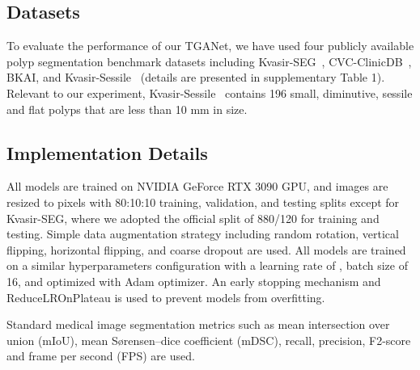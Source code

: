 \documentclass[runningheads]{llncs}
\begin{document}
\subsection{Datasets}
To evaluate the performance of our TGANet, we have used four publicly available polyp segmentation benchmark datasets including Kvasir-SEG~\cite{jha2020kvasir}, CVC-ClinicDB~\cite{bernal2015wm}, BKAI\cite{lan2021neounet}, and Kvasir-Sessile~\cite{jha2021comprehensive} (details are presented in supplementary Table 1). Relevant to our experiment, Kvasir-Sessile~\cite{jha2021comprehensive} contains 196 small, diminutive, sessile and flat polyps that are less than 10 mm in size. 

\subsection{Implementation Details}
All models are trained on NVIDIA GeForce RTX 3090 GPU, and images are resized to  pixels with 80:10:10 training, validation, and testing splits except for Kvasir-SEG, where we adopted the official split of 880/120 for training and testing. Simple data augmentation strategy including random rotation, vertical flipping, horizontal flipping, and coarse dropout are used. All models are trained on a similar hyperparameters configuration with a learning rate of , batch size of 16, and optimized with Adam optimizer. An early stopping mechanism and ReduceLROnPlateau is used to prevent models from overfitting.  

Standard medical image segmentation metrics such as mean intersection over union (mIoU), mean Sørensen–dice coefficient (mDSC), recall, precision, F2-score and frame per second (FPS) are used. 
\end{document}
